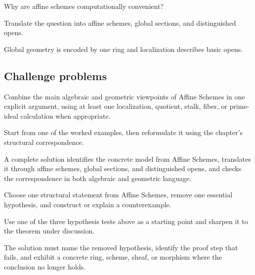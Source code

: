 \begin{exercise}\label{exr:vi18-expand-14}
Why are affine schemes computationally convenient?
\end{exercise}
\begin{hint}
Translate the question into affine schemes, global sections, and distinguished opens.
\end{hint}
\begin{solution}
Global geometry is encoded by one ring and localization describes basic opens.
\end{solution}

\subsection*{Challenge problems}

\begin{exercise}\label{exr:vi18-expand-15}
Combine the main algebraic and geometric viewpoints of Affine Schemes in one explicit argument, using at least one localization, quotient, stalk, fiber, or prime-ideal calculation when appropriate.
\end{exercise}
\begin{hint}
Start from one of the worked examples, then reformulate it using the chapter's structural correspondence.
\end{hint}
\begin{solution}
A complete solution identifies the concrete model from Affine Schemes, translates it through affine schemes, global sections, and distinguished opens, and checks the correspondence in both algebraic and geometric language.
\end{solution}

\begin{exercise}\label{exr:vi18-expand-16}
Choose one structural statement from Affine Schemes, remove one essential hypothesis, and construct or explain a counterexample.
\end{exercise}
\begin{hint}
Use one of the three hypothesis tests above as a starting point and sharpen it to the theorem under discussion.
\end{hint}
\begin{solution}
The solution must name the removed hypothesis, identify the proof step that fails, and exhibit a concrete ring, scheme, sheaf, or morphism where the conclusion no longer holds.
\end{solution}


